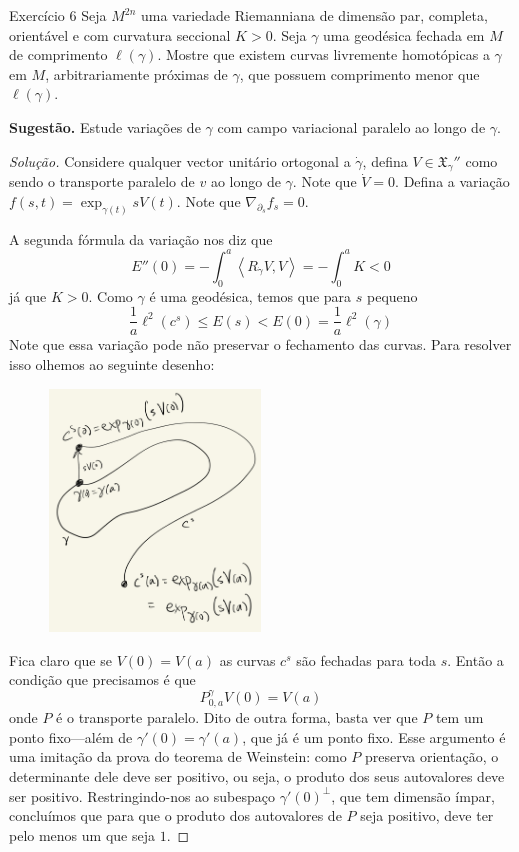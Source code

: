 \begin{thing6}{Exercício 6}\label{exer:6}\leavevmode
Seja \(M^{2n}\) uma variedade Riemanniana de dimensão par, completa, orientável e com curvatura seccional \(K>0\). Seja \(\gamma\) uma geodésica fechada em \(M\) de comprimento \(\ell(\gamma)\). Mostre que existem curvas livremente homotópicas a \(\gamma\) em \(M\), arbitrariamente próximas de \(\gamma\), que possuem comprimento menor que \(\ell(\gamma)\).

\textbf{Sugestão.} Estude variações de \(\gamma\) com campo variacional paralelo ao longo de \(\gamma\).
\end{thing6}

\begin{proof}[Solução]\leavevmode
Considere qualquer vector unitário ortogonal a \(\dot \gamma\), defina \(V\in \mathfrak{X}_{\gamma}''\) como sendo o transporte paralelo de \(v\) ao longo de \(\gamma\). Note que \(\dot V=0\). Defina a variação \(f(s,t)=\operatorname{exp}_{\gamma(t)}sV(t)\). Note que \(\nabla_{\partial_s}f_s=0\).

A segunda fórmula da variação nos diz que
\[E''(0)=-\int_0^a \left<R_{\dot \gamma}V,V\right>=-\int_0^a K<0\]
já que \(K>0\). Como \(\gamma\) é uma geodésica, temos que para \(s\) pequeno
\[\frac{1}{a}\ell^2(c^s)\leq E(s) < E(0)= \frac{1}{a}\ell^2(\gamma)\]
Note que essa variação pode não preservar o fechamento das curvas. Para resolver isso olhemos ao seguinte desenho:
\begin{figure}[H]
	\centering
	\includegraphics[width=0.5\textwidth]{fig6}
\end{figure}
Fica claro que se \(V(0)=V(a)\) as curvas \(c^s\) são fechadas para toda \(s\). Então a condição que precisamos é que
\[P^\gamma_{0,a}V(0)=V(a)\]
onde \(P\) é o transporte paralelo. Dito de outra forma, basta ver que \(P\) tem um ponto fixo---além de \(\gamma'(0)=\gamma'(a)\), que já é um ponto fixo. Esse argumento é uma imitação da prova do teorema de Weinstein: como \(P\) preserva orientação, o determinante dele deve ser positivo, ou seja, o produto dos seus autovalores deve ser positivo. Restringindo-nos ao subespaço \(\gamma'(0)^\perp\), que tem dimensão ímpar, concluímos que para que o produto dos autovalores de \(P\) seja positivo, deve ter pelo menos um que seja \(1\).
\end{proof}
